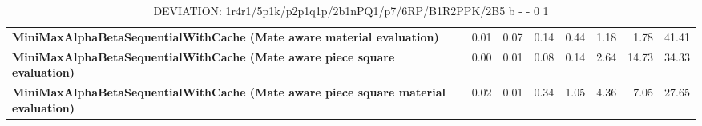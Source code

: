 \begin{table}[H]
{\begin{tabular}{|p{8cm}|*{7}{r|}}
            \rowcolor[HTML]{EFEFEF}
            \textbf{MiniMaxAlphaBetaSequentialWithCache (Mate aware material evaluation)}              & 0.01 & 0.07 & 0.14 & 0.44 & 1.18 & 1.78 & 41.41 \\
            \rowcolor[HTML]{FFFFFF}
            \textbf{MiniMaxAlphaBetaSequentialWithCache (Mate aware piece square evaluation)}               & 0.00 & 0.01 & 0.08 & 0.14 & 2.64 & 14.73 & 34.33 \\
            \rowcolor[HTML]{EFEFEF}
            \textbf{MiniMaxAlphaBetaSequentialWithCache (Mate aware piece square material evaluation)}               & 0.02 & 0.01 & 0.34 & 1.05 & 4.36 & 7.05 & 27.65 \\

            \hline
        \end{tabular}%
    }
    \caption{DEVIATION: 1r4r1/5p1k/p2p1q1p/2b1nPQ1/p7/6RP/B1R2PPK/2B5 b - - 0 1}
    \label{tab:complex-position-with-many-options-deviation}
\end{table}
